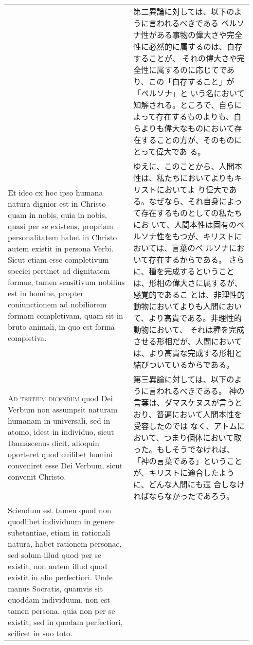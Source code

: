 \documentclass[10pt]{jsarticle} %
\begin{document}
\begin{longtable}{p{21em}p{21em}}
&

第二異論に対しては、以下のように言われるべきである
ペルソナ性がある事物の偉大さや完全性に必然的に属するのは、自存することが、
 それの偉大さや完全性に属するのに応じてであり、この「自存すること」が「ペルソナ」と
 いう名において知解される。ところで、自らによって存在するものよりも、自
 らよりも偉大なものにおいて存在することの方が、そのものにとって偉大であ
 る。


\\


Et ideo ex hoc ipso humana natura
dignior est in Christo quam in nobis, quia in nobis, quasi per se
existens, propriam personalitatem habet in Christo autem existit in
persona Verbi. Sicut etiam esse completivum speciei pertinet ad
dignitatem formae, tamen sensitivum nobilius est in homine, propter
coniunctionem ad nobiliorem formam completivam, quam sit in bruto
animali, in quo est forma completiva.


&

ゆえに、このことから、人間本性は、私たちにおいてよりもキリストにおいてよ
 り偉大である。なぜなら、それ自身によって存在するものとしての私たちにお
 いて、人間本性は固有のペルソナ性をもつが、キリストにおいては、言葉のペ
 ルソナにおいて存在するからである。
さらに、種を完成するということは、形相の偉大さに属するが、感覚的であるこ
 とは、非理性的動物においてよりも人間において、より高貴である。非理性的動物において、
 それは種を完成させる形相だが、人間においては、より高貴な完成する形相と
 結びついているからである。


\\



{\scshape Ad tertium dicendum} quod Dei Verbum non assumpsit naturam humanam in
universali, sed in atomo, idest in individuo, sicut Damascenus dicit,
alioquin oporteret quod cuilibet homini conveniret esse Dei Verbum,
sicut convenit Christo. 



&

第三異論に対しては、以下のように言われるべきである。
神の言葉は、ダマスケヌスが言うとおり、普遍において人間本性を受容したのでは
 なく、アトムにおいて、つまり個体において取った。もしそうでなければ、
 「神の言葉である」ということが、キリストに適合したように、どんな人間にも適
 合しなければならなかったであろう。


\\


Sciendum est tamen quod non quodlibet individuum
in genere substantiae, etiam in rationali natura, habet rationem
personae, sed solum illud quod per se existit, non autem illud quod
existit in alio perfectiori. Unde manus Socratis, quamvis sit quoddam
individuum, non est tamen persona, quia non per se existit, sed in
quodam perfectiori, scilicet in suo toto. 




\end{longtable}
\end{document}
